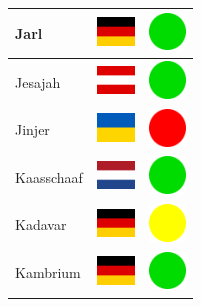 \documentclass[12pt, a4paper, twoside]{report}
\begin{document}
\begin{center}
\begin{longtable}{|p{5cm}|p{2cm}|p{2cm}|}
Jarl & \includegraphics[width=1cm]{4x3/de} & \includegraphics[width=1cm]{likes/y} \\ \hline
Jesajah & \includegraphics[width=1cm]{4x3/at} & \includegraphics[width=1cm]{likes/y} \\ \hline
Jinjer & \includegraphics[width=1cm]{4x3/ua} & \includegraphics[width=1cm]{likes/n} \\ \hline
Kaasschaaf & \includegraphics[width=1cm]{4x3/nl} & \includegraphics[width=1cm]{likes/y} \\ \hline
Kadavar & \includegraphics[width=1cm]{4x3/de} & \includegraphics[width=1cm]{likes/m} \\ \hline
Kambrium & \includegraphics[width=1cm]{4x3/de} & \includegraphics[width=1cm]{likes/y} \\ \hline

\end{longtable}
\end{center}
\end{document}
